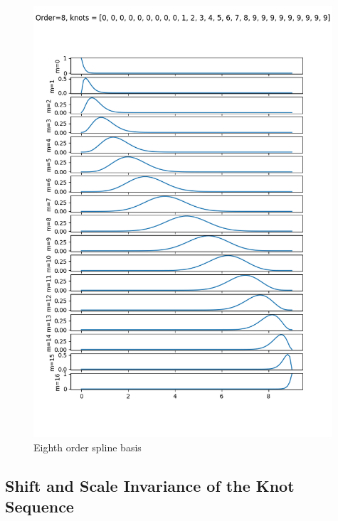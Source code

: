 \documentclass{article}
\begin{document}
\begin{figure}[hbt]
  \centering\includegraphics[width=0.99\textwidth]{./figures/spline_basis_8}
  \caption{Eighth order spline basis}
  \label{fig:spline_basis_8}  
\end{figure}

\clearpage

\subsection{Shift and Scale Invariance of the Knot Sequence}
\end{document}
